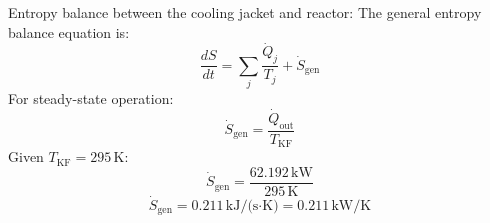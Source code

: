 Entropy balance between the cooling jacket and reactor:  
The general entropy balance equation is:  
\[
\frac{dS}{dt} = \sum_j \frac{\dot{Q}_j}{T_j} + \dot{S}_{\text{gen}}
\]  
For steady-state operation:  
\[
\dot{S}_{\text{gen}} = \frac{\dot{Q}_{\text{out}}}{T_{\text{KF}}}
\]  
Given \( T_{\text{KF}} = 295 \, \text{K} \):  
\[
\dot{S}_{\text{gen}} = \frac{62.192 \, \text{kW}}{295 \, \text{K}}
\]  
\[
\dot{S}_{\text{gen}} = 0.211 \, \text{kJ/(s·K)} = 0.211 \, \text{kW/K}
\]